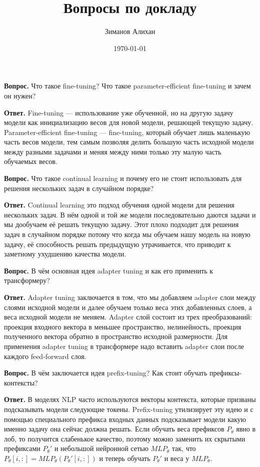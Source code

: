 \documentclass[12pt, a4paper]{article}
\title{Вопросы по докладу}
\author{Зиманов Алихан}
\date{\today}
\begin{document}
\maketitle

\par \bigskip \textbf{Вопрос. } Что такое fine-tuning? Что такое parameter-efficient fine-tuning и зачем он нужен?

\par \bigskip \textbf{Ответ. } Fine-tuning --- использование уже обученной, но на другую задачу модели как инициализацию весов для новой модели, решающей текущую задачу. Parameter-efficient fine-tuning --- fine-tuning, который обучает лишь маленькую часть весов модели, тем самым позволяя делить большую часть исходной модели между разными задачами и меняя между ними только эту малую часть обучаемых весов.

\par \bigskip \textbf{Вопрос. } Что такое continual learning и почему его не стоит использовать для решения нескольких задач в случайном порядке?

\par \bigskip \textbf{Ответ. } Continual learning это подход обучения одной модели для решения нескольких задач. В нём одной и той же модели последовательно даются задачи и мы дообучаем её решать текущую задачу. Этот плохо подходит для решения задач в случайном порядке потому что когда мы обучаем нашу модель на новую задачу, её способность решать предыдущую утрачивается, что приводит к заметному ухудшению качества модели.

\par \bigskip \textbf{Вопрос. } В чём основная идея adapter tuning и как его применить к трансформеру?

\par \bigskip \textbf{Ответ. } Adapter tuning заключается в том, что мы добавляем adapter слои между слоями исходной модели и далее обучаем только веса этих добавленных слоев, а веса исходной модели не меняем. Adapter слой состоит из трех преобразований: проекция входного вектора в меньшее пространство, нелинейность, проекция полученного вектора обратно в пространство исходной размерности. Для применения adapter tuning в трансформере надо вставить adapter слои после каждого feed-forward слоя.

\par \bigskip \textbf{Вопрос. } В чём заключается идея prefix-tuning? Как стоит обучать префиксы-контексты?

\par \bigskip \textbf{Ответ. } В моделях NLP часто используются векторы контекста, которые призваны подсказывать модели следующие токены. Prefix-tuning утилизирует эту идею и с помощью специального префикса входных данных подсказывает модели какую именно задачу она сейчас должна решать. Если обучать веса префиксов $P_{\theta}$ явно в лоб, то получится слабенькое качество, поэтому можно заменить их скрытыми префиксами $P_{\theta}'$ и небольшой нейронной сетью $MLP_{\theta}$ так, что $P_{\theta}[i, :] = MLP_{\theta}(P_{\theta}'[i, :])$ и теперь обучать $P_{\theta}'$ и веса у $MLP_{\theta}$.
\end{document}
